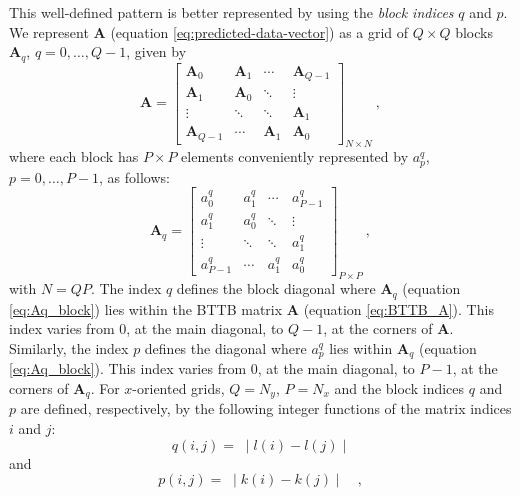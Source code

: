 \documentclass[manuscript,revised]{geophysics}
\begin{document}
This well-defined pattern is better represented by using the \textit{block indices} $q$ and $p$. 
We represent $\mathbf{A}$ (equation \ref{eq:predicted-data-vector}) as a grid of $Q \times Q$ blocks 
$\mathbf{A}_{q}$, $q = 0, \dots, Q - 1$, given by
\begin{equation}
	\mathbf{A} = \begin{bmatrix}
	\mathbf{A}_{0}   & \mathbf{A}_{1} & \cdots         & \mathbf{A}_{Q-1} \\
	\mathbf{A}_{1}   & \mathbf{A}_{0} & \ddots         & \vdots           \\ 
	\vdots           & \ddots         & \ddots         & \mathbf{A}_{1}   \\
	\mathbf{A}_{Q-1} & \cdots         & \mathbf{A}_{1} & \mathbf{A}_{0}                 
	\end{bmatrix}_{N \times N} \: ,
	\label{eq:BTTB_A}
\end{equation}
where each block has $P \times P$ elements conveniently represented by $a^{q}_{p}$, 
$p = 0, \dots, P - 1$, as follows:
\begin{equation}
	\mathbf{A}_{q} = \begin{bmatrix}
	a^{q}_{0}   & a^{q}_{1} & \cdots    & a^{q}_{P-1} \\
	a^{q}_{1}   & a^{q}_{0} & \ddots    & \vdots           \\ 
	\vdots      & \ddots    & \ddots    & a^{q}_{1}   \\
	a^{q}_{P-1} & \cdots    & a^{q}_{1} & a^{q}_{0}                 
	\end{bmatrix}_{P \times P} \: ,
	\label{eq:Aq_block}
\end{equation}
with $N = QP$. The index $q$ defines the block diagonal where $\mathbf{A}_{q}$ (equation \ref{eq:Aq_block}) 
lies within the BTTB matrix $\mathbf{A}$ (equation \ref{eq:BTTB_A}). 
This index varies from $0$, at the main diagonal, to $Q - 1$, at
the corners of $\mathbf{A}$. Similarly, the index $p$ defines the diagonal where $a^{q}_{p}$ 
lies within $\mathbf{A}_{q}$ (equation \ref{eq:Aq_block}). This index varies from $0$, 
at the main diagonal, to $P - 1$, at the corners of $\mathbf{A}_{q}$.
For $x$-oriented grids, $Q = N_{y}$, $P = N_{x}$ and the block indices
$q$ and $p$ are defined, respectively, by the following integer functions 
of the matrix indices $i$ and $j$:
\begin{equation}
q(i, j) = \; \mid l(i) - l(j) \mid
\label{eq:q-x-oriented}
\end{equation}
and
\begin{equation}
p(i, j) = \; \mid k(i) - k(j) \mid \quad ,
\label{eq:p-x-oriented}
\end{equation}
\end{document}
